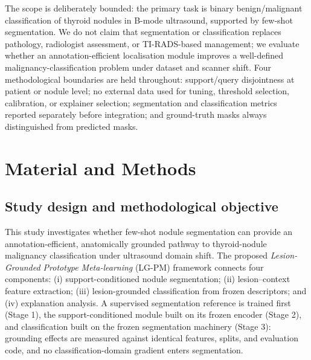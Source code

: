 \documentclass[jimh,article,submit,moreauthors,pdftex]{Definitions/tsp}
\begin{document}
The scope is deliberately bounded: the primary task is binary
benign/malignant classification of thyroid nodules in B-mode ultrasound,
supported by few-shot segmentation. We do not claim that segmentation or
classification replaces pathology, radiologist assessment, or
TI-RADS-based management; we evaluate whether an annotation-efficient
localisation module improves a well-defined malignancy-classification
problem under dataset and scanner shift. Four methodological boundaries
are held throughout: support/query disjointness at patient or nodule
level; no external data used for tuning, threshold selection,
calibration, or explainer selection; segmentation and classification
metrics reported separately before integration; and ground-truth masks
always distinguished from predicted masks.


\section{Material and Methods}\label{sec:methodology_revised}

\subsection{Study design and methodological objective}
\label{subsec:study_design}

This study investigates whether few-shot nodule segmentation can provide
an annotation-efficient, anatomically grounded pathway to thyroid-nodule
malignancy classification under ultrasound domain shift. The proposed
\emph{Lesion-Grounded Prototype Meta-learning} (LG-PM) framework
connects four components: (i) support-conditioned nodule segmentation;
(ii) lesion--context feature extraction; (iii) lesion-grounded
classification from frozen descriptors; and (iv) explanation analysis. A
supervised segmentation reference is trained first (Stage 1), the
support-conditioned module built on its frozen encoder (Stage 2), and
classification built on the frozen segmentation machinery (Stage 3):
grounding effects are measured against identical features, splits, and
evaluation code, and no classification-domain gradient enters
segmentation.
\end{document}
